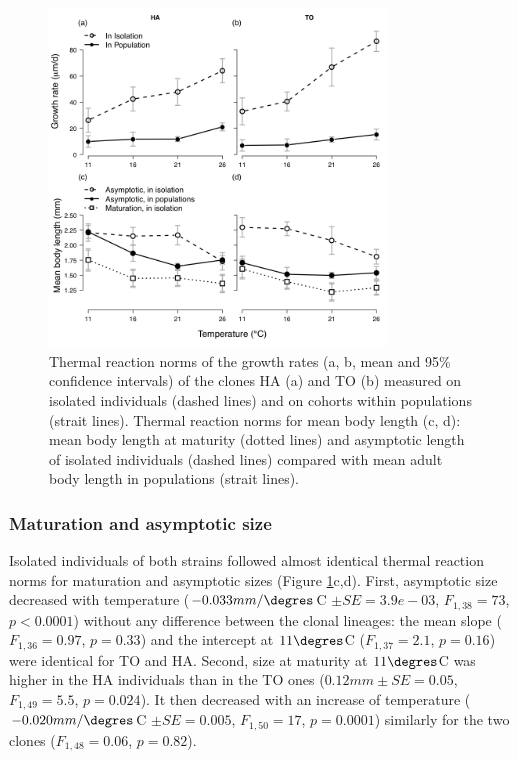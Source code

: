 \begin{figure}[!ht] %
\centering
\includegraphics[width=0.80\textwidth]{1_CorpsDeThese/Resumes/Fig/FIP03} 
\caption[Thermal reaction norms of the growth
rates]{ Thermal reaction norms of the growth rates (a, b, mean and 95\% confidence intervals) of the clones HA (a) and TO (b) measured on isolated individuals (dashed lines)
and on cohorts within populations (strait lines). Thermal reaction norms for
mean body length (c, d): mean body length at maturity (dotted lines) and
asymptotic length of isolated individuals (dashed lines) compared with mean
adult body length in populations (strait lines).}
\label{Fig5-3}
\end{figure}

\subsubsection{Maturation and asymptotic size}

Isolated individuals of both strains followed almost identical thermal reaction
norms for maturation and asymptotic sizes (Figure \ref{Fig5-3}c,d). First,
asymptotic size decreased with temperature ($-0.033 mm/\degres$C $\pm SE =
3.9e-03$, $F_{1,38} = 73$, $p < 0.0001$) without any difference between the
clonal lineages: the mean slope ($F_{1,36} = 0.97$, $p = 0.33$) and the
intercept at $11\degres$C ($F_{1,37} = 2.1$, $p = 0.16$) were identical for TO
and HA. Second, size at maturity at $11\degres$C was higher in the HA
individuals than in the TO ones ($0.12 mm \pm SE = 0.05$, $F_{1,49} = 5.5$, $p =
0.024$).
It then decreased with an increase of temperature ($-0.020 mm/\degres$C $\pm
SE=0.005$, $F_{1,50} = 17$, $p = 0.0001$) similarly for the two clones
($F_{1,48} = 0.06$, $p = 0.82$).


